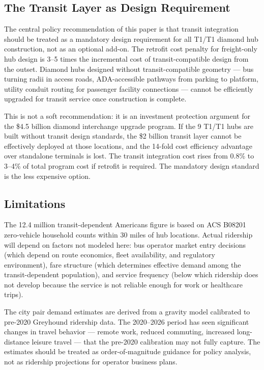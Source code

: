 \subsection{The Transit Layer as Design Requirement}

The central policy recommendation of this paper is that transit integration should be treated as a mandatory design requirement for all T1/T1 diamond hub construction, not as an optional add-on. The retrofit cost penalty for freight-only hub design is 3--5 times the incremental cost of transit-compatible design from the outset. Diamond hubs designed without transit-compatible geometry --- bus turning radii in access roads, ADA-accessible pathways from parking to platform, utility conduit routing for passenger facility connections --- cannot be efficiently upgraded for transit service once construction is complete.

This is not a soft recommendation: it is an investment protection argument for the \$4.5 billion diamond interchange upgrade program. If the 9 T1/T1 hubs are built without transit design standards, the \$2 billion transit layer cannot be effectively deployed at those locations, and the 14-fold cost efficiency advantage over standalone terminals is lost. The transit integration cost rises from 0.8\% to 3--4\% of total program cost if retrofit is required. The mandatory design standard is the less expensive option.

\subsection{Limitations}

The 12.4 million transit-dependent Americans figure is based on ACS B08201 zero-vehicle household counts within 30 miles of hub locations. Actual ridership will depend on factors not modeled here: bus operator market entry decisions (which depend on route economics, fleet availability, and regulatory environment), fare structure (which determines effective demand among the transit-dependent population), and service frequency (below which ridership does not develop because the service is not reliable enough for work or healthcare trips).

The city pair demand estimates are derived from a gravity model calibrated to pre-2020 Greyhound ridership data. The 2020--2026 period has seen significant changes in travel behavior --- remote work, reduced commuting, increased long-distance leisure travel --- that the pre-2020 calibration may not fully capture. The estimates should be treated as order-of-magnitude guidance for policy analysis, not as ridership projections for operator business plans.

